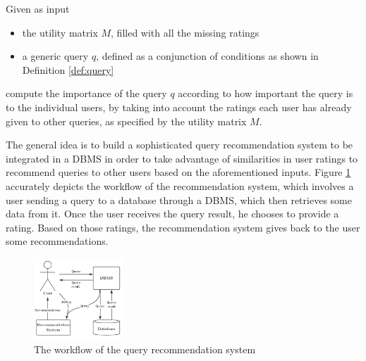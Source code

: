 \begin{definition}
    Given as input
    \begin{itemize}
        \item the utility matrix $M$, filled with all the missing ratings
        \item a generic query $q$, defined as a conjunction of conditions as shown in Definition \ref{def:query} 
    \end{itemize}
    compute the importance of the query $q$ according to how important the query is to the individual users, by taking into account the ratings each user has already given to other queries, as specified by the utility matrix $M$.
\end{definition}


The general idea is to build a sophisticated query recommendation system to be integrated in a DBMS in order to take advantage of similarities in user ratings to recommend queries to other users based on the aforementioned inputs. Figure \ref{fig:workflow} accurately depicts the workflow of the recommendation system, which involves a user sending a query to a database through a DBMS, which then retrieves some data from it. Once the user receives the query result, he chooses to provide a rating. Based on those ratings, the recommendation system gives back to the user some recommendations.


\begin{figure}[h]
    \centering
    \includegraphics[width=0.30\textwidth]{imgs/architecture.pdf}
    \caption{\normalfont The workflow of the query recommendation system}
    \label{fig:workflow}
\end{figure}